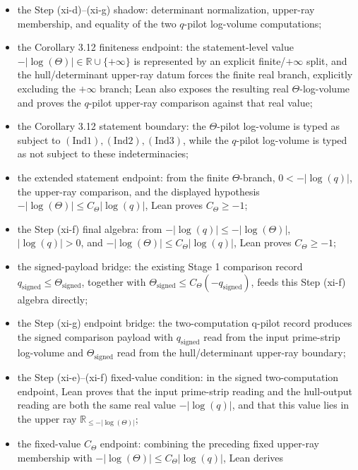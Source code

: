 \documentclass[11pt]{article}
\begin{document}
\begin{itemize}
  Hodge-theater histories;
\item the Step (xi-d)--(xi-g) shadow: determinant normalization, upper-ray
  membership, and equality of the two \(q\)-pilot log-volume computations;
\item the Corollary 3.12 finiteness endpoint:
  the statement-level value \(-|\log(\Theta)|\in\mathbb{R}\cup\{+\infty\}\)
  is represented by an explicit finite/\(+\infty\) split, and the
  hull/determinant upper-ray datum forces the finite real branch, explicitly
  excluding the \(+\infty\) branch; Lean also exposes the resulting real
  \(\Theta\)-log-volume and proves the \(q\)-pilot upper-ray comparison against
  that real value;
\item the Corollary 3.12 statement boundary:
  the \(\Theta\)-pilot log-volume is typed as subject to
  \((\mathrm{Ind1}),(\mathrm{Ind2}),(\mathrm{Ind3})\), while the \(q\)-pilot
  log-volume is typed as not subject to these indeterminacies;
\item the extended statement endpoint:
  from the finite \(\Theta\)-branch, \(0<-|\log(q)|\), the upper-ray comparison,
  and the displayed hypothesis
  \(-|\log(\Theta)|\le C_\Theta|\log(q)|\), Lean proves \(C_\Theta\ge-1\);
\item the Step (xi-f) final algebra:
  from \(-|\log(q)|\le-|\log(\Theta)|\), \(|\log(q)|>0\), and
  \(-|\log(\Theta)|\le C_\Theta|\log(q)|\), Lean proves \(C_\Theta\ge-1\);
\item the signed-payload bridge:
  the existing Stage 1 comparison record \(q_{\mathrm{signed}}\le
  \Theta_{\mathrm{signed}}\), together with
  \(\Theta_{\mathrm{signed}}\le C_\Theta(-q_{\mathrm{signed}})\), feeds this
  Step (xi-f) algebra directly;
\item the Step (xi-g) endpoint bridge:
  the two-computation q-pilot record produces the signed comparison payload
  with \(q_{\mathrm{signed}}\) read from the input prime-strip log-volume and
  \(\Theta_{\mathrm{signed}}\) read from the hull/determinant upper-ray
  boundary;
\item the Step (xi-e)--(xi-f) fixed-value condition:
  in the signed two-computation endpoint, Lean proves that the input
  prime-strip reading and the hull-output reading are both the same real value
  \(-|\log(q)|\), and that this value lies in the upper ray
  \(\mathbb{R}_{\le-|\log(\Theta)|}\);
\item the fixed-value \(C_\Theta\) endpoint:
  combining the preceding fixed upper-ray membership with
  \(-|\log(\Theta)|\le C_\Theta|\log(q)|\), Lean derives

\end{itemize}
\end{document}
